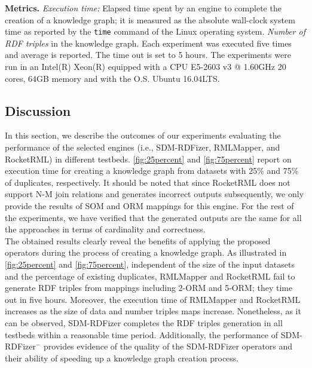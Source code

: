 \noindent\textbf{Metrics.} \textit{Execution time:} Elapsed time spent by an engine to complete the creation of a knowledge graph; it is measured as the absolute wall-clock system time as reported by the \verb|time| command of the Linux operating system. \textit{Number of RDF triples} in the knowledge graph. Each experiment was executed five times and average is reported. The time out is set to 5 hours. The experiments were run in an Intel(R) Xeon(R) equipped with a CPU E5-2603 v3 @ 1.60GHz 20 cores, 64GB memory and with the O.S. Ubuntu 16.04LTS.

\subsection*{Discussion}
In this section, we describe the outcomes of our experiments evaluating the performance of the selected engines (i.e., SDM-RDFizer, RMLMapper, and RocketRML) in different testbeds.
\autoref{fig:25percent} and \autoref{fig:75percent} report on execution time for creating a knowledge graph from datasets with 25\% and 75\% of duplicates, respectively. It should be noted that since RocketRML does not support N-M join relations and generates incorrect outputs subsequently, we only provide the results of SOM and ORM mappings for this engine. For the rest of the experiments, we have verified that the generated outputs are the same for all the approaches in terms of cardinality and correctness.\\
\noindent The obtained results clearly reveal the benefits of applying the proposed operators during the process of creating a knowledge graph. As illustrated in \autoref{fig:25percent} and \autoref{fig:75percent}, independent of the size of the input datasets and the percentage of existing duplicates, RMLMapper and RocketRML fail to generate RDF triples from mappings including 2-ORM and 5-ORM; they time out in five hours. Moreover, the execution time of RMLMapper and RocketRML increases as the size of data and number triples maps increase. Nonetheless, as it can be observed, SDM-RDFizer completes the RDF triples generation in all testbeds within a reasonable time period. Additionally, the performance of SDM-RDFizer$^-$ provides evidence of the quality of the SDM-RDFizer operators and their ability of speeding up a knowledge graph creation process.       
